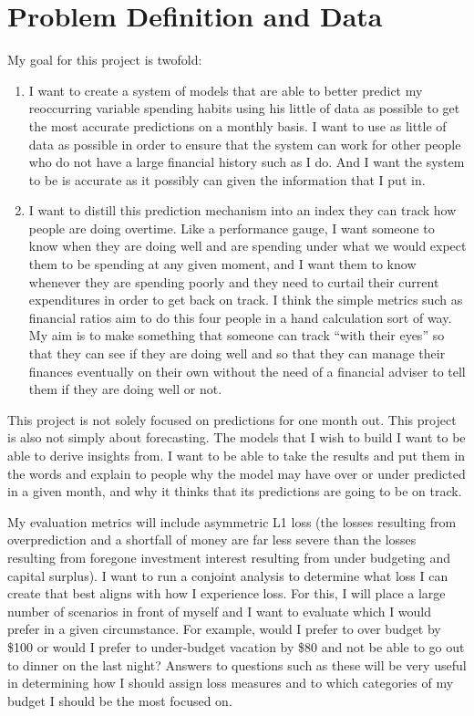 \documentclass[11pt,a4paper]{article}
\begin{document}
\section{Problem Definition and Data}
\label{sec:problem}

My goal for this project is twofold: 
\begin{enumerate}
	\item I want to create a system of models that are able to better predict my reoccurring variable spending habits using his little of data as possible to get the most accurate predictions on a monthly basis.  I want to use as little of data as possible in order to ensure that the system can work for other people who do not have a large financial history such as I do. And I want the system to be is accurate as it possibly can given the information that I put in.
	\item I want to distill this prediction mechanism into an index they can track how people are doing overtime. Like a performance gauge, I want someone to know when they are doing well and are spending under what we would expect them to be spending at any given moment, and I want them to know whenever they are spending poorly and they need to curtail their current expenditures in order to get back on track. I think the simple metrics such as financial ratios aim to do this four people in a hand calculation sort of way. My aim is to make something that someone can track “with their eyes” so that they can see if they are doing well and so that they can manage their finances eventually on their own without the need of a financial adviser to tell them if they are doing well or not. 
\end{enumerate}

This project is not solely focused on predictions for one month out. This project is also not simply about forecasting. The models that I wish to build I want to be able to derive insights from. I want to be able to take the results and put them in the words and explain to people why the model may have over or under predicted in a given month, and why it thinks that its predictions are going to be on track. 

My evaluation metrics will include asymmetric L1 loss (the losses resulting from overprediction and a shortfall of money are far less severe than the losses resulting from foregone investment interest resulting from under budgeting and capital surplus). I want to run a conjoint analysis to determine what loss I can create that best aligns with how I experience loss. For this, I will place a large number of scenarios in front of myself and I want to evaluate which I would prefer in a given circumstance. For example, would I prefer to over budget by \$100 or would I prefer to under-budget vacation by \$80 and not be able to go out to dinner on the last night? Answers to questions such as these will be very useful in determining how I should assign loss measures and to which categories of my budget I should be the most focused on. 
\end{document}

